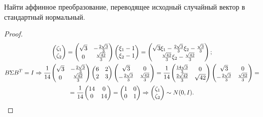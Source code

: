 \begin{problem}
	Найти аффинное преобразование, переводящее исходный случайный вектор в стандартный нормальный. 
\end{problem}

\begin{proof}	
	\begin{multline} \begin{pmatrix} \zeta_1 \\ \zeta_2 \end{pmatrix}=\begin{pmatrix} \sqrt3 & -\frac{2\sqrt{3}}{3} \\ 0 & \frac{\sqrt{42}}{3} \end{pmatrix}\begin{pmatrix} \xi_1-1 \\ \xi_2-1 \end{pmatrix}=\begin{pmatrix} \sqrt{3}\xi_1-\frac{2\sqrt{3}}{3}\xi_2-\frac{\sqrt{3}}{3} \\ \frac{\sqrt{42}}{3}\xi_2-\frac{\sqrt{42}}{3} \end{pmatrix};	
	\\B \Sigma B^T = I \Rightarrow 	
	\cfrac1{14}\begin{pmatrix} \sqrt3 & -\frac{2\sqrt{3}}{3} \\ 0 & \frac{\sqrt{42}}{3} \end{pmatrix}\begin{pmatrix} 6 & 2 \\ 2 & 3 \end{pmatrix}\begin{pmatrix} \sqrt3 & 0 \\ -\frac{2\sqrt{3}}{3} & \frac{\sqrt{42}}{3} \end{pmatrix}=\cfrac1{14}\begin{pmatrix} \frac{14\sqrt{3}}{3} & 0 \\ \frac{2\sqrt{42}}{3} & \sqrt{42} \end{pmatrix}\begin{pmatrix} \sqrt3 & 0 \\ -\frac{2\sqrt{3}}{3} & \frac{\sqrt{42}}{3} \end{pmatrix}=\\=\cfrac1{14}\begin{pmatrix} 14 & 0 \\ 0 & 14 \end{pmatrix}=\begin{pmatrix} 1 & 0 \\ 0 & 1 \end{pmatrix}\Rightarrow \begin{pmatrix} \zeta_1 \\ \zeta_2 \end{pmatrix}\sim N(0, I).	
	\end{multline} 		
\end{proof}


